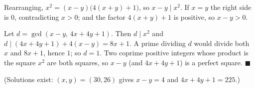 Rearranging, $x^2=(x-y)\bigl(4(x+y)+1\bigr)$, so $x-y\mid x^2$. If $x=y$ the right side is $0$, contradicting $x>0$; and the factor $4(x+y)+1$ is positive, so $x-y>0$.

Let $d=\gcd(x-y,\,4x+4y+1)$. Then $d\mid x^2$ and $d\mid(4x+4y+1)+4(x-y)=8x+1$. A prime dividing $d$ would divide both $x$ and $8x+1$, hence $1$; so $d=1$. Two coprime positive integers whose product is the square $x^2$ are both squares, so $x-y$ (and $4x+4y+1$) is a perfect square. $\blacksquare$

(Solutions exist: $(x,y)=(30,26)$ gives $x-y=4$ and $4x+4y+1=225$.)
